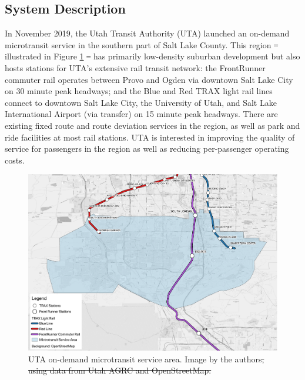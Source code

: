 \documentclass[smartcities,article,submit,moreauthors,pdftex]{mdpi} %
\providecommand{\DIFadd}[1]{{\protect\color{blue}\uwave{#1}}} %
\providecommand{\DIFdel}[1]{{\protect\color{red}\sout{#1}}}                      %
\providecommand{\DIFaddbegin}{} %
\providecommand{\DIFaddend}{} %
\providecommand{\DIFdelbegin}{} %
\providecommand{\DIFdelend}{} %
\providecommand{\DIFdelFL}[1]{\DIFdel{#1}} %
\providecommand{\DIFaddbeginFL}{} %
\providecommand{\DIFaddendFL}{} %
\providecommand{\DIFdelbeginFL}{} %
\providecommand{\DIFdelendFL}{} %
\begin{document}
\hypertarget{system-description}{%
\subsection{System Description}\label{system-description}}

\DIFaddend In November 2019, the Utah Transit Authority (UTA) launched an on-demand
microtransit service in the southern part of Salt Lake County. This region \DIFdelbegin \DIFdel{– }\DIFdelend \DIFaddbegin \DIFadd{--
}\DIFaddend illustrated in Figure \ref{fig:via-map} \DIFdelbegin \DIFdel{– }\DIFdelend \DIFaddbegin \DIFadd{-- }\DIFaddend has primarily low-density suburban
development but also hosts stations for UTA's extensive rail transit network:
the FrontRunner commuter rail operates between Provo and Ogden via downtown Salt
Lake City on 30 minute peak headways; and the Blue and Red TRAX light rail lines
connect to downtown Salt Lake City, the University of Utah, and Salt Lake
International Airport (via transfer) on 15 minute peak headways. There are
existing fixed route and route deviation services in the region, as well as park
and ride facilities at most rail stations. UTA is interested in improving the
quality of service for passengers in the region as well as reducing
per-passenger operating costs.

\begin{figure}
\DIFdelbeginFL %
\DIFdelendFL \DIFaddbeginFL \includegraphics[width=1\linewidth]{images/service_area} \DIFaddendFL \caption{UTA on-demand microtransit service area. Image by the authors\DIFdelbeginFL \DIFdelFL{, using data from Utah AGRC and OpenStreetMap.}\DIFdelendFL }\label{fig:via-map}
\end{figure}
\end{document}
